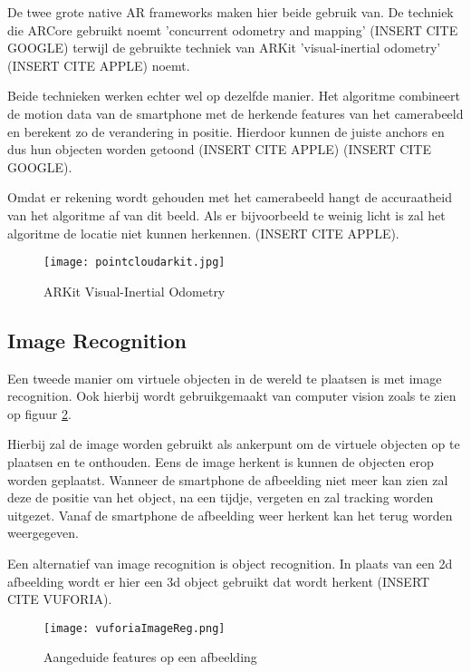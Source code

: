 De twee grote native AR frameworks maken hier beide gebruik van. De techniek die ARCore gebruikt noemt 'concurrent odometry and mapping' (INSERT CITE GOOGLE) terwijl de gebruikte techniek van ARKit 'visual-inertial odometry' (INSERT CITE APPLE) noemt. 

Beide technieken werken echter wel op dezelfde manier. Het algoritme combineert de motion data van de smartphone met de herkende features van het camerabeeld en berekent zo de verandering in positie. Hierdoor kunnen de juiste anchors en dus hun objecten worden getoond (INSERT CITE APPLE) (INSERT CITE GOOGLE).

Omdat er rekening wordt gehouden met het camerabeeld hangt de accuraatheid van het algoritme af van dit beeld. Als er bijvoorbeeld te weinig licht is zal het algoritme de locatie niet kunnen herkennen. (INSERT CITE APPLE).

\begin{figure}
    \texttt{[image: pointcloudarkit.jpg]}
    \caption{ARKit Visual-Inertial Odometry}
    \label{fig:pointcloudarkit}
\end{figure}


\subsection{Image Recognition}
Een tweede manier om virtuele objecten in de wereld te plaatsen is met image recognition. Ook hierbij wordt gebruikgemaakt van computer vision zoals te zien op figuur \ref{fig:imagereg}.

Hierbij zal de image worden gebruikt als ankerpunt om de virtuele objecten op te plaatsen en te onthouden. Eens de image herkent is kunnen de objecten erop worden geplaatst. Wanneer de smartphone de afbeelding niet meer kan zien zal deze de positie van het object, na een tijdje, vergeten en zal tracking worden uitgezet. Vanaf de smartphone de afbeelding weer herkent kan het terug worden weergegeven.

Een alternatief van image recognition is object recognition. In plaats van een 2d afbeelding wordt er hier een 3d object gebruikt dat wordt herkent (INSERT CITE VUFORIA).

\begin{figure}
    \texttt{[image: vuforiaImageReg.png]}
    \caption{Aangeduide features op een afbeelding}
    \label{fig:imagereg}
\end{figure}

